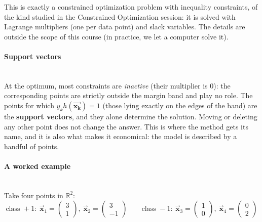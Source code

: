 \documentclass[]{article}
\newcommand{\R}{\mathbb{R}}
\newcommand{\vecx}{ \vec{\mathbf{x}} }
\newcommand{\vecxk}{ \vec{\mathbf{x_k}} }
\begin{document}
	This is exactly a constrained optimization problem with inequality constraints, of the kind studied in the Constrained Optimization session: it is solved with Lagrange multipliers (one per data point) and slack variables.
	The details are outside the scope of this course (in practice, we let a computer solve it).

	\paragraph{Support vectors}
	\noindent\\
	At the optimum, most constraints are \textit{inactive} (their multiplier is $0$): the corresponding points are strictly outside the margin band and play no role.
	The points for which $y_k h(\vecxk) = 1$ (those lying exactly on the edges of the band) are the \textbf{support vectors}, and they alone determine the solution.
	Moving or deleting any other point does not change the answer.
	This is where the method gets its name, and it is also what makes it economical: the model is described by a handful of points.

	\paragraph{A worked example}
	\noindent\\
	Take four points in $\R^2$:
	$$
	\text{class } +1: \ \vecx_1 = \begin{pmatrix} 3 \\ 1 \end{pmatrix}, \ \vecx_2 = \begin{pmatrix} 3 \\ -1 \end{pmatrix}
	\qquad
	\text{class } -1: \ \vecx_3 = \begin{pmatrix} 1 \\ 0 \end{pmatrix}, \ \vecx_4 = \begin{pmatrix} 0 \\ 2 \end{pmatrix}
	$$
\end{document}
